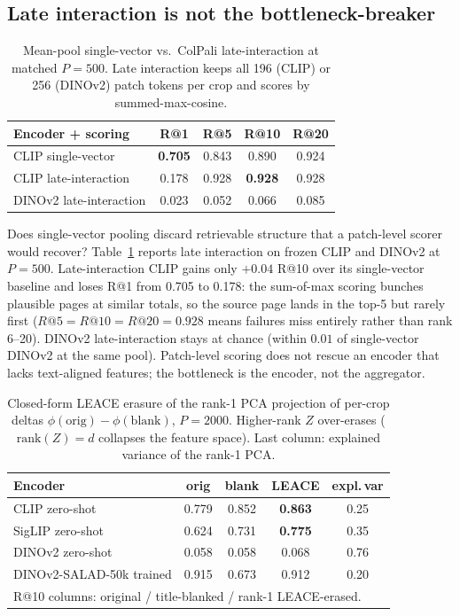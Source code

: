 \documentclass{article}
\begin{document}
\subsection{Late interaction is not the bottleneck-breaker}
\label{sec:colpali}

\begin{table}[t]
\caption{Mean-pool single-vector vs.\ ColPali \cite{faysse2025colpali}
late-interaction at matched $P=500$. Late interaction keeps all
196 (CLIP) or 256 (DINOv2) patch tokens per crop and scores by
summed-max-cosine.}
\label{tab:lateint}
\centering
\small
\begin{tabular}{lcccc}
\toprule
Encoder + scoring & R@1 & R@5 & R@10 & R@20 \\
\midrule
\rowcolor{cITC} CLIP single-vector       & \textbf{0.705} & 0.843 & 0.890 & 0.924 \\
\rowcolor{cITC} CLIP late-interaction    & 0.178 & 0.928 & \textbf{0.928} & 0.928 \\
\rowcolor{cSSL} DINOv2 late-interaction  & 0.023 & 0.052 & 0.066 & 0.085 \\
\bottomrule
\end{tabular}
\end{table}

Does single-vector pooling discard retrievable structure that a
patch-level scorer would recover? Table~\ref{tab:lateint} reports
late interaction on frozen CLIP and DINOv2 at $P=500$.
Late-interaction CLIP gains only $+0.04$ R@10 over its single-vector
baseline and loses R@1 from 0.705 to 0.178: the sum-of-max scoring
bunches plausible pages at similar totals, so the source page lands
in the top-5 but rarely first ($R@5{=}R@10{=}R@20{=}0.928$ means
failures miss entirely rather than rank 6--20). DINOv2
late-interaction stays at chance (within $0.01$ of single-vector
DINOv2 at the same pool). Patch-level scoring does not rescue an
encoder that lacks text-aligned features; the bottleneck is the
encoder, not the aggregator.
\begin{table}[t]
\caption{Closed-form LEACE \cite{belrose2023leace} erasure of the
rank-1 PCA projection of per-crop deltas
$\phi(\mathrm{orig}){-}\phi(\mathrm{blank})$, $P{=}2000$.
Higher-rank $Z$ over-erases ($\mathrm{rank}(Z){=}d$ collapses the
feature space). Last column: explained variance of the rank-1 PCA.}
\label{tab:leace}
\centering
\small
\begin{tabular}{lcccc}
\toprule
Encoder & orig & blank & LEACE & expl.\,var \\
\midrule
\rowcolor{cITC} CLIP zero-shot           & 0.779 & 0.852 & \textbf{0.863} & 0.25 \\
\rowcolor{cITC} SigLIP zero-shot         & 0.624 & 0.731 & \textbf{0.775} & 0.35 \\
\rowcolor{cSSL} DINOv2 zero-shot         & 0.058 & 0.058 & 0.068          & 0.76 \\
\rowcolor{cFT}  DINOv2-SALAD-50k trained & 0.915 & 0.673 & 0.912          & 0.20 \\
\bottomrule
\multicolumn{5}{l}{\footnotesize R@10 columns: original / title-blanked / rank-1 LEACE-erased.}
\end{tabular}
\end{table}
\end{document}
